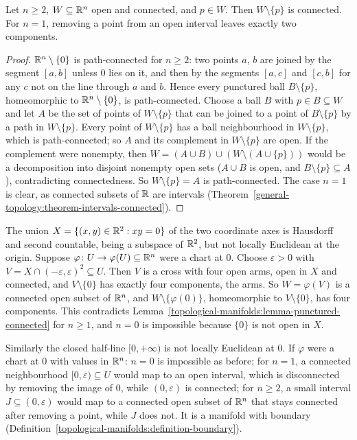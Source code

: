 \begin{lemma}\label{topological-manifolds:lemma-punctured-connected}
Let $n \geq 2$, $W \subseteq \mathbb{R}^n$ open and connected, and $p \in W$. Then $W \setminus \{p\}$ is connected. For $n = 1$, removing a point from an open interval leaves exactly two components.
\end{lemma}

\begin{proof}
$\mathbb{R}^n \setminus \{0\}$ is path-connected for $n \geq 2$: two points $a$, $b$ are joined by the segment $[a, b]$ unless $0$ lies on it, and then by the segments $[a, c]$ and $[c, b]$ for any $c$ not on the line through $a$ and $b$.
Hence every punctured ball $B \setminus \{p\}$, homeomorphic to $\mathbb{R}^n \setminus \{0\}$, is path-connected. Choose a ball $B$ with $p \in B \subseteq W$ and let $A$ be the set of points of $W \setminus \{p\}$ that can be joined to a
point of $B \setminus \{p\}$ by a path in $W \setminus \{p\}$. Every point of $W \setminus \{p\}$ has a ball neighbourhood in $W \setminus \{p\}$, which is path-connected; so $A$ and its complement in $W \setminus \{p\}$ are open. If
the complement were nonempty, then $W = (A \cup B) \cup (W \setminus (A \cup \{p\}))$ would be a decomposition into disjoint nonempty open sets ($A \cup B$ is open, and $B \setminus \{p\} \subseteq A$), contradicting connectedness. So
$W \setminus \{p\} = A$ is path-connected. The case $n = 1$ is clear, as connected subsets of $\mathbb{R}$ are intervals (Theorem~\ref{general-topology:theorem-intervals-connected}).
\end{proof}

\begin{counterexample}\label{topological-manifolds:counterexample-not-locally-euclidean}
The union $X = \{(x, y) \in \mathbb{R}^2 : xy = 0\}$ of the two coordinate axes is Hausdorff and second countable, being a subspace of $\mathbb{R}^2$, but not locally Euclidean at the origin. Suppose $\varphi \colon U \to \varphi(U) \subseteq \mathbb{R}^n$ were a
chart at $0$. Choose $\varepsilon > 0$ with $V = X \cap (-\varepsilon, \varepsilon)^2 \subseteq U$. Then $V$ is a cross with four open arms, open in $X$ and connected, and $V \setminus \{0\}$ has exactly four components, the arms.
So $W = \varphi(V)$ is a connected open subset of $\mathbb{R}^n$, and $W \setminus \{\varphi(0)\}$, homeomorphic to $V \setminus \{0\}$, has four components. This contradicts Lemma~\ref{topological-manifolds:lemma-punctured-connected} for
$n \geq 1$, and $n = 0$ is impossible because $\{0\}$ is not open in $X$.

Similarly the closed half-line $[0, +\infty)$ is not locally Euclidean at $0$. If $\varphi$ were a chart at $0$ with values in $\mathbb{R}^n$: $n = 0$ is impossible as before; for $n = 1$, a connected neighbourhood $[0, \varepsilon) \subseteq U$
would map to an open interval, which is disconnected by removing the image of $0$, while $(0, \varepsilon)$ is connected; for $n \geq 2$, a small interval $J \subseteq (0, \varepsilon)$ would map to a connected open subset of $\mathbb{R}^n$ that
stays connected after removing a point, while $J$ does not. It is a manifold with boundary (Definition~\ref{topological-manifolds:definition-boundary}).
\end{counterexample}

